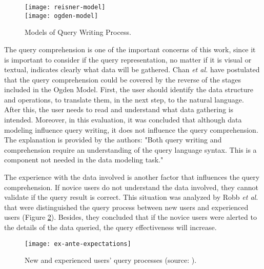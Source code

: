 \begin{figure}[htbp]
  \centering
    {\texttt{[image: reisner-model]}}%
    \\
    {\texttt{[image: ogden-model]}}%
\caption{Models of Query Writing Process.}
  \label{fig:models_of_query_writing_process}
\end{figure}

The query comprehension is one of the important concerns of this work, since it is important to consider if the query representation, no matter if it is visual or textual, indicates clearly what data will be gathered. %
Chan \textit{et al.} \cite{anEvaluationOfNoviceEndUserComputingPerformance} have postulated that the query comprehension could be covered by the reverse of the stages included in the Ogden Model. First, the user should identify the data structure and operations, to translate them, in the next step, to the natural language. After this, the user needs to read and understand what data gathering is intended. Moreover, in this evaluation, it was concluded that although data modeling influence query writing, it does not influence the query comprehension. The explanation is provided by the authors: "Both query writing and comprehension require an understanding of the query language syntax. This is a component not needed in the data modeling task."

The experience with the data involved is another factor that influences the query comprehension. If novice users do not understand the data involved, they cannot validate if the query result is correct. This situation was analyzed by Robb \textit{et al.} \cite{improvingNewUsersQueryPerformance} that were distinguished the query process between new users and experienced users (Figure \ref{fig:ex_ante_expectations}). Besides, they concluded that if the novice users were alerted to the details of the data queried, the query effectiveness will increase.

\begin{figure}[htbp]
  \centering
    {\texttt{[image: ex-ante-expectations]}}%
\caption{New and experienced users’ query processes (source: \cite{improvingNewUsersQueryPerformance}).}
  \label{fig:ex_ante_expectations}
\end{figure}


